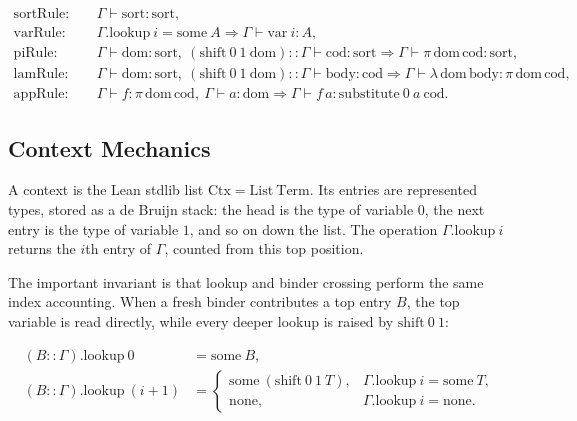 $$
\begin{aligned}
\mathrm{sortRule}:&\quad
  \Gamma \vdash \mathrm{sort} : \mathrm{sort}, \\
\mathrm{varRule}:&\quad
  \Gamma.\mathrm{lookup}\ i = \mathrm{some}\ A
  \Rightarrow \Gamma \vdash \mathrm{var}\ i : A, \\
\mathrm{piRule}:&\quad
  \Gamma \vdash \mathrm{dom} : \mathrm{sort},\
  (\mathrm{shift}\ 0\ 1\ \mathrm{dom}) :: \Gamma
  \vdash \mathrm{cod} : \mathrm{sort}
  \Rightarrow \Gamma \vdash
  \pi\,\mathrm{dom}\,\mathrm{cod} : \mathrm{sort}, \\
\mathrm{lamRule}:&\quad
  \Gamma \vdash \mathrm{dom} : \mathrm{sort},\
  (\mathrm{shift}\ 0\ 1\ \mathrm{dom}) :: \Gamma
  \vdash \mathrm{body} : \mathrm{cod}
  \Rightarrow \Gamma \vdash
  \lambda\,\mathrm{dom}\,\mathrm{body}
  : \pi\,\mathrm{dom}\,\mathrm{cod}, \\
\mathrm{appRule}:&\quad
  \Gamma \vdash f : \pi\,\mathrm{dom}\,\mathrm{cod},\
  \Gamma \vdash a : \mathrm{dom}
  \Rightarrow \Gamma \vdash f\,a :
  \mathrm{substitute}\ 0\ a\ \mathrm{cod}.
\end{aligned}
$$



\subsection{Context Mechanics}\label{subsec:reconstruction-context-mechanics}

A context is the Lean stdlib list $\mathrm{Ctx}=\mathrm{List}\ \mathrm{Term}$.
Its entries are represented types, stored as a de Bruijn stack: the head is
the type of variable $0$, the next entry is the type of variable $1$, and so
on down the list. The operation $\Gamma.\mathrm{lookup}\ i$ returns the
$i$th entry of $\Gamma$, counted from this top position.

The important invariant is that lookup and binder crossing perform the same
index accounting. When a fresh binder contributes a top entry $B$, the top
variable is read directly, while every deeper lookup is raised by
$\mathrm{shift}\ 0\ 1$:

$$
\begin{aligned}
(B :: \Gamma).\mathrm{lookup}\ 0
  &= \mathrm{some}\ B, \\
(B :: \Gamma).\mathrm{lookup}\ (i+1)
  &=
  \begin{cases}
    \mathrm{some}\ (\mathrm{shift}\ 0\ 1\ T),
      & \Gamma.\mathrm{lookup}\ i=\mathrm{some}\ T, \\
    \mathrm{none},
      & \Gamma.\mathrm{lookup}\ i=\mathrm{none}.
  \end{cases}
\end{aligned}
$$

